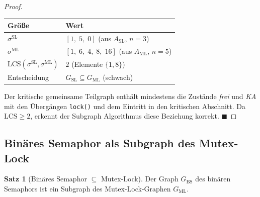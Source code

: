 ﻿\documentclass[a4paper,12pt]{article}
\theoremstyle{definition}
\newtheorem{satz}{Satz}
\begin{document}
\begin{proof}
\medskip
\begin{center}
\begin{tabular}{ll}
  \toprule
  Größe & Wert \\
  \midrule
  $\sigma^{\mathrm{SL}}$ & $[1,\; 5,\; 0]$ (aus $A_{\mathrm{SL}}$, $n=3$) \\
  $\sigma^{\mathrm{ML}}$ & $[1,\; 6,\; 4,\; 8,\; 16]$ (aus $A_{\mathrm{ML}}$, $n=5$) \\
  LCS$(\sigma^{\mathrm{SL}}, \sigma^{\mathrm{ML}})$ & $2$ (Elemente $\{1, 8\}$) \\
  Entscheidung & $G_{\mathrm{SL}} \subseteq G_{\mathrm{ML}}$ (schwach) \\
  \bottomrule
\end{tabular}
\end{center}

\medskip
Der kritische gemeinsame Teilgraph enthält mindestens die Zustände
\emph{frei} und \emph{KA} mit den Übergängen \texttt{lock()} und dem
Eintritt in den kritischen Abschnitt. Da $\mathrm{LCS} \geq 2$, erkennt der
Subgraph Algorithmus diese Beziehung korrekt.
\hfill$\blacksquare$
\end{proof}

\subsection{Binäres Semaphor als Subgraph des Mutex-Lock}

\begin{satz}[Binäres Semaphor $\subseteq$ Mutex-Lock]
  \label{satz:bs_ml}
  Der Graph $G_{\mathrm{BS}}$ des binären Semaphors ist ein Subgraph des
  Mutex-Lock-Graphen $G_{\mathrm{ML}}$.
\end{satz}
\end{document}
